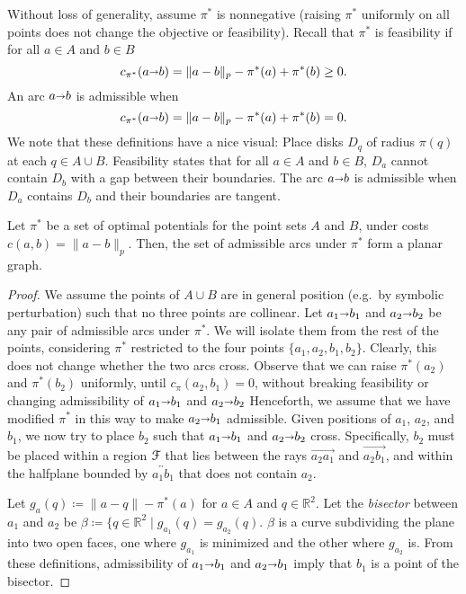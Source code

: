 \documentclass[a4paper,UKenglish]{socg-lipics-v2018}
\def\reals{\mathbb{R}}
\def\norm#1{\mathopen\| #1 \mathclose\|}	%
\def\arcto{\mathord\shortrightarrow}
\def\arc#1#2{#1\arcto#2}
\theoremstyle{plain}
\numberwithin{figure}{section}
\def\EMPH#1{\textcolor{BrickRed}{{\emph{#1}}}}
\begin{document}
\begin{toappendix}
Without loss of generality, assume $\pi^*$ is nonnegative (raising $\pi^*$
uniformly on all points does not change the objective or feasibility).
Recall that $\pi^*$ is feasibility if for all $a \in A$ and $b \in B$
\[
	c_{\pi^*}(\arc ab) = \norm{a-b}_p - \pi^*(a) + \pi^*(b) \geq 0.
\]
An arc $\arc ab$ is admissible when
\[
	c_{\pi^*}(\arc ab) = \norm{a-b}_p - \pi^*(a) + \pi^*(b) = 0.
\]
We note that these definitions have a nice visual:
Place disks $D_q$ of radius $\pi(q)$ at each $q \in A \cup B$.
Feasibility states that for all $a \in A$ and $b \in B$, $D_a$ cannot contain
$D_b$ with a gap between their boundaries.
The arc $\arc ab$ is admissible when $D_a$ contains $D_b$ and their boundaries
are tangent.

\begin{lemmarep}
\label{lemma:admiss_planar}
Let $\pi^*$ be a set of optimal potentials for the point sets $A$ and $B$,
under costs $c(a, b) = \norm{a-b}_p$.
Then, the set of admissible arcs under $\pi^*$ form a planar graph.
\end{lemmarep}

\begin{proof}
We assume the points of $A \cup B$ are in general position (e.g.\ by symbolic
perturbation) such that no three points are collinear.
Let $\arc{a_1}{b_1}$ and $\arc{a_2}{b_2}$ be any pair of admissible arcs under
$\pi^*$.
We will isolate them from the rest of the points, considering $\pi^*$
restricted to the four points $\{a_1, a_2, b_1, b_2\}$.
Clearly, this does not change whether the two arcs cross.
Observe that we can raise $\pi^*(a_2)$ and $\pi^*(b_2)$ uniformly, until
$c_\pi(a_2, b_1) = 0$, without breaking feasibility or changing admissibility
of $\arc{a_1}{b_1}$ and $\arc{a_2}{b_2}$
Henceforth, we assume that we have modified $\pi^*$ in this way to make
$\arc{a_2}{b_1}$ admissible.
Given positions of $a_1$, $a_2$, and $b_1$, we now try to place $b_2$ such that
$\arc{a_1}{b_1}$ and $\arc{a_2}{b_2}$ cross.
Specifically, $b_2$ must be placed within a region $\EuScript{F}$ that lies
between the rays $\overrightarrow{a_2 a_1}$ and $\overrightarrow{a_2 b_1}$,
and within the halfplane bounded by $\overleftrightarrow{a_1 b_1}$ that does
not contain $a_2$.

Let $g_a(q) \coloneqq \norm{a-q} - \pi^*(a)$ for $a \in A$ and
$q \in \reals^2$.
Let the \EMPH{bisector} between $a_1$ and $a_2$ be
$\beta \coloneqq \{q \in \reals^2 \mid g_{a_1}(q) = g_{a_2}(q)$.
$\beta$ is a curve subdividing the plane into two open faces, one where
$g_{a_1}$ is minimized and the other where $g_{a_2}$ is.
From these definitions, admissibility of $\arc{a_1}{b_1}$ and $\arc{a_2}{b_1}$
imply that $b_1$ is a point of the bisector.


\end{proof}
\end{toappendix}
\end{document}
